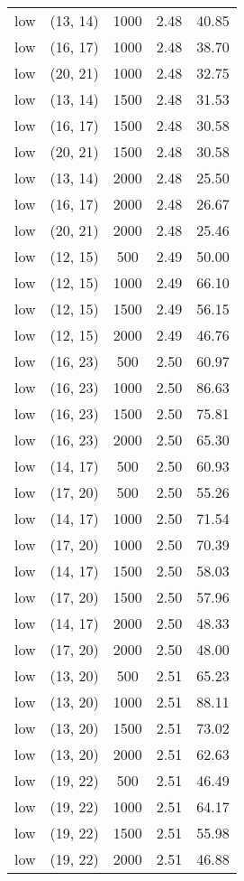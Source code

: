 \begin{tabular}{c c c c c}
low & (13, 14) &  1000 & 2.48 & 40.85 \\
low & (16, 17) &  1000 & 2.48 & 38.70 \\
low & (20, 21) &  1000 & 2.48 & 32.75 \\
low & (13, 14) &  1500 & 2.48 & 31.53 \\
low & (16, 17) &  1500 & 2.48 & 30.58 \\
low & (20, 21) &  1500 & 2.48 & 30.58 \\
low & (13, 14) &  2000 & 2.48 & 25.50 \\
low & (16, 17) &  2000 & 2.48 & 26.67 \\
low & (20, 21) &  2000 & 2.48 & 25.46 \\
low & (12, 15) &  500 & 2.49 & 50.00 \\
low & (12, 15) &  1000 & 2.49 & 66.10 \\
low & (12, 15) &  1500 & 2.49 & 56.15 \\
low & (12, 15) &  2000 & 2.49 & 46.76 \\
low & (16, 23) &  500 & 2.50 & 60.97 \\
low & (16, 23) &  1000 & 2.50 & 86.63 \\
low & (16, 23) &  1500 & 2.50 & 75.81 \\
low & (16, 23) &  2000 & 2.50 & 65.30 \\
low & (14, 17) &  500 & 2.50 & 60.93 \\
low & (17, 20) &  500 & 2.50 & 55.26 \\
low & (14, 17) &  1000 & 2.50 & 71.54 \\
low & (17, 20) &  1000 & 2.50 & 70.39 \\
low & (14, 17) &  1500 & 2.50 & 58.03 \\
low & (17, 20) &  1500 & 2.50 & 57.96 \\
low & (14, 17) &  2000 & 2.50 & 48.33 \\
low & (17, 20) &  2000 & 2.50 & 48.00 \\
low & (13, 20) &  500 & 2.51 & 65.23 \\
low & (13, 20) &  1000 & 2.51 & 88.11 \\
low & (13, 20) &  1500 & 2.51 & 73.02 \\
low & (13, 20) &  2000 & 2.51 & 62.63 \\
low & (19, 22) &  500 & 2.51 & 46.49 \\
low & (19, 22) &  1000 & 2.51 & 64.17 \\
low & (19, 22) &  1500 & 2.51 & 55.98 \\
low & (19, 22) &  2000 & 2.51 & 46.88 \\

\end{tabular}

